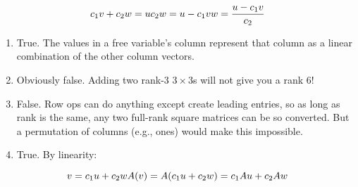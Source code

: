 \documentclass[]{article}
\begin{document}
\[c_1v+c_2w=u\\
c_2w = u-c_1v\\
w = \frac{u-c_1v}{c_2}\]

\begin{enumerate}
\def\labelenumi{\arabic{enumi}.}
\setcounter{enumi}{35}
\item
  True. The values in a free variable's column represent that column as
  a linear combination of the other column vectors.
\item
  Obviously false. Adding two rank-3 \(3\times{3}\)s will not give you a
  rank 6!
\item
  False. Row ops can do anything except create leading entries, so as
  long as rank is the same, any two full-rank square matrices can be so
  converted. But a permutation of columns (e.g., ones) would make this
  impossible.
\item
  True. By linearity:
\end{enumerate}

\[v=c_1u+c_2w\\
A(v)=A(c_1u+c_2w)=c_1Au+c_2Aw\]
\end{document}
